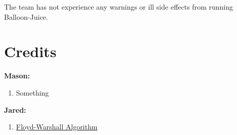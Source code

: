 \documentclass{article}
\begin{document}
The team has not experience any warnings or ill side effects from running Balloon-Juice.

\newpage

\section{Credits}

\begin{flushleft}
\textbf{Mason:}

\begin{enumerate}
\item Something
\end{enumerate}

\textbf{Jared:}


\begin{enumerate}
\item \href{https://en.wikipedia.org/wiki/Floyd-Warshall_algorithm}{Floyd-Warshall Algorithm}
\end{enumerate}
\end{flushleft}
\end{document}
